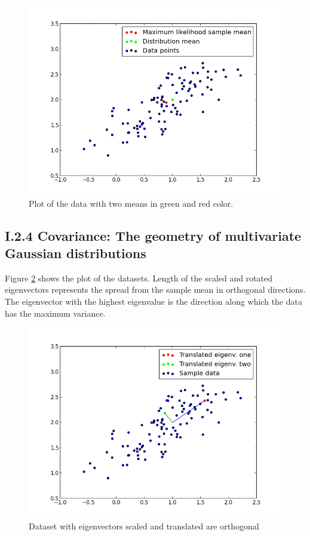 \documentclass[12pt]{article}
\begin{document}
  \begin{figure}[H]
    \centering
        \includegraphics[width=1.0\textwidth]{figures/figure_I_2_3}
    \caption{Plot of the data with two means in green and red color.}
    \label{fig:distribution_with_means}
  \end{figure}

\subsection*{I.2.4 Covariance: The geometry of multivariate Gaussian distributions}

  Figure \ref{fig:distribution_with_eigenvectors} shows the plot of the datasets. Length of the scaled and rotated eigenvectors represents the spread from the sample mean in orthogonal directions. The eigenvector with the highest eigenvalue is the direction along which the data has the maximum variance. 

  \begin{figure}[H]
    \centering
        \includegraphics[width=1.0\textwidth]{figures/figure_I_2_4}
    \caption{Dataset with eigenvectors scaled and translated are orthogonal}
    \label{fig:distribution_with_eigenvectors}
  \end{figure}
\end{document}
